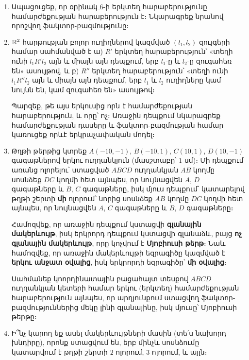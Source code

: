 \begin{enumerate}[label=\thesection.\arabic*.]
$\displaystyle \hfill h : S \times S \rightarrow S \times S, \quad h(s_1,s_2)=(s_2,s_1), \quad s_1,s_2 \in S \hfill$ 

արտապատկերումը

\begin{enumerate}
    \item[ա)]  $S \times S$ վերացական տորը փոխմիարժեք արտա\-պատ\-կերում է ինքն իր վրա,
    
    \item[բ)] $h$-ը վերացական տորի զուգահեռականները արտապատկերում է նրա միջօրեականների, իսկ միջօրեականները՝ զուգահեռականների։
\end{enumerate}

\item Ապացուցեք, որ \hyperref[ch2ex6]{օրինակ 6}-ի երկտեղ հարաբերությունը համարժեքության \linebreak հարա\-բերություն է։ Նկարագրեք նրանով որոշվող ֆակտոր-բազմությունը։

\item  $\mathbb{R}^2$ հարթության բոլոր ուղիղներով կազմված $(l_1,l_2)$ զույգերի համար սահ\-ման\-ված է ա) $R'$ երկտեղ հարաբերություն՝ «տեղի ունի $l_1R'l_2$ այն և միայն այն դեպքում, երբ $l_1$-ը և $l_2$-ը զուգահեռ են» ասույթով, և բ) $R''$ երկտեղ հարաբերություն՝ «տեղի ունի $l_1R''l_2$ այն և միայն այն դեպքում, երբ $l_1$ և $l_2$ ուղիղները կամ նույնն են, կամ զուգահեռ են» ասույթով։
\par Պարզեք, թե այս երկուսից որն է համարժեքության հարաբերություն, և որը՝ ոչ։ Առաջին դեպքում նկարագրեք համարժեքության դասերը և ֆակտոր-բազ\-մու\-թյան համար կառուցեք որևէ երկրաչափական մոդել։

\item  Թղթի թերթից կտրեք $A(-10,-1)$, $B(-10,1)$, $C(10,1)$, $D(10,-1)$ գագաթներով երկու ուղղանկյուն (մասշտաբը՝ $1$ սմ)։ Մի դեպքում առանց ոլորելու՝ ստացված $ABCD$ ուղղանկյան $AB$ կողմը սոսնձեք $DC$ կողմի հետ այնպես, որ նույնաց\-վեն $A$, $D$ գագաթները և $B$, $C$ գագաթները, իսկ մյուս դեպքում՝ կատարելով թղթի շերտի \textbf{մի} ոլորում՝ նորից սոսնձեք $AB$ կողմը $DC$ կողմի հետ այնպես, որ նույնաց\-վեն $A$, $C$ գագաթները և $B$, $D$ գագաթները։
\par Համոզվեք, որ առաջին դեպքում կստացվի \textbf{գլանային մակերևույթ}, իսկ երկ\-րորդ դեպքում կստացվի գլանաձև, բայց \textbf{ոչ գլանային մակերևույթ}, որը կոչ\-վում է \textbf{Մյոբիուսի թերթ}։ Նաև համոզվեք, որ առաջին մակերևույթի եզրա\-գի\-ծը կազմված է \textbf{երկու անջատ օվալից}, իսկ երկրորդի եզրագիծը՝ \textbf{մի օվալից}։
\par Սահմանեք կոորդինատային բացահայտ տեսքով $ABCD$ ուղ\-ղանկ\-յան կետերի համար երկու (երկտեղ) համարժեքության հարաբերություն այնպես, որ արդ\-յունքում ստացվող ֆակտոր-բազմություններից մեկը լինի գլանայինը, իսկ մյու\-սը՝ Մյոբիուսի թերթը։

\item Ի՞նչ կարող եք ասել մակերևույթների մասին (տե՛ս նախորդ խնդիրը), որոնք ստացվում են, երբ մինչև սոսնձումը կատարվում է թղթի շերտի $2$ ոլորում, $3$ ոլորում, և այլն։
\end{enumerate}
